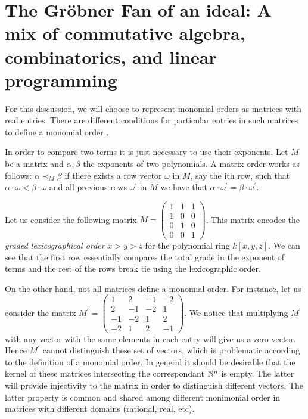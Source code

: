 \section{The Gr\"obner Fan of an ideal: A mix of commutative algebra,
  combinatorics, and linear programming}

For this discussion, we will choose to represent monomial orders as matrices with
real entries. There are different conditions for particular entries in such matrices
to define a monomial order \cite{Cox:2014}.

In order to compare two terms it is just necessary to use their exponents. Let $M$
be a matrix and $\alpha, \beta$ the exponents of two polynomials.
A matrix order works as follows: $\alpha \prec_M \beta$
if there exists a row vector $\omega$ in $M$, say the ith row, such that
$\alpha \cdot \omega < \beta \cdot \omega$ and all previous rows $\omega^{'}$ in $M$
we have that $\alpha \cdot \omega^{'} = \beta \cdot \omega^{'}$.

\begin{example} Let us consider the following matrix
  $M = \begin{pmatrix} 1 & 1 & 1 \\
    1 & 0 & 0 \\
    0 & 1 & 0 \\
    0 & 0 & 1 \end{pmatrix}$. This matrix encodes the \emph{graded lexicographical
    order} $x > y > z$ for the polynomial ring $k[x, y, z]$. We can see that the first row
  essentially compares the total grade in the exponent of terms and the rest
  of the rows break tie using the lexicographic order.
\end{example}

\begin{example}
  On the other hand, not all matrices define a monomial order. For instance, let
  us consider the matrix $M^{'} = \begin{pmatrix} 1 & 2 & -1 & -2 \\
    2 & -1 & -2 & 1 \\
    -1 & -2 & 1 & 2 \\
    -2 & 1 & 2 & -1
  \end{pmatrix}$. We notice that multiplying $M^{'}$ with any vector with the same elements in each
  entry will give us a zero vector. Hence $M^{'}$ cannot distinguish
  these set of vectors, which is problematic according to the definition
  of a monomial order. In general it should be desirable that the kernel
  of these matrices intersecting the correspondant $\mathbb{N}^n$ is empty.
  The latter will provide injectivity to the matrix in order to distinguish
  different vectors. The latter property is common and shared among different
  monimonial order in matrices with different domains (rational, real, etc).
\end{example}

